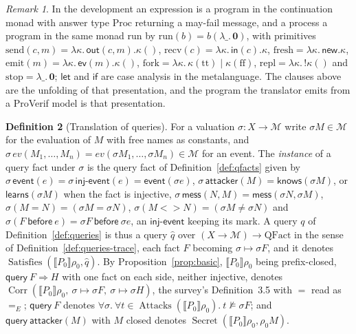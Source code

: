 \documentclass[11pt]{article}
\theoremstyle{definition}
\newtheorem{definition}{Definition}[section]
\theoremstyle{plain}
\theoremstyle{remark}
\newtheorem{remark}[definition]{Remark}
\newcommand{\Proc}{\mathrm{Proc}}
\newcommand{\Attacks}{\operatorname{Attacks}}
\newcommand{\Secret}{\operatorname{Secret}}
\newcommand{\Corr}{\operatorname{Corr}}
\newcommand{\Satisfies}{\operatorname{Satisfies}}
\newcommand{\sem}[1]{\llbracket #1 \rrbracket}
\begin{document}
\begin{remark}
In the development an expression is a program in the continuation monad with answer type $\Proc$ returning a may-fail message, and a process a program in the same monad run by $\mathrm{run}(b)=b(\lambda\_.\,\mathbf{0})$, with primitives $\mathrm{send}(c,m)=\lambda\kappa.\,\mathsf{out}(c,m).\kappa()$, $\mathrm{recv}(c)=\lambda\kappa.\,\mathsf{in}(c).\kappa$, $\mathrm{fresh}=\lambda\kappa.\,\mathsf{new}.\kappa$, $\mathrm{emit}(m)=\lambda\kappa.\,\mathsf{ev}(m).\kappa()$, $\mathrm{fork}=\lambda\kappa.\,\kappa(\mathrm{tt})\mid\kappa(\mathrm{ff})$, $\mathrm{repl}=\lambda\kappa.\,!\kappa()$ and $\mathrm{stop}=\lambda\_.\,\mathbf{0}$; $\mathsf{let}$ and $\mathsf{if}$ are case analysis in the metalanguage. The clauses above are the unfolding of that presentation, and the program the translator emits from a ProVerif model is that presentation.
\end{remark}

\begin{definition}[Translation of queries]\label{def:queries-translation}
For a valuation $\sigma:X\to\mathcal{M}$ write $\sigma M\in\mathcal{M}$ for the evaluation of $M$ with free names as constants, and $\sigma\,ev(M_1,\dots,M_n)=ev(\sigma M_1,\dots,\sigma M_n)\in\mathcal{M}$ for an event. The \emph{instance} of a query fact under $\sigma$ is the query fact of Definition~\ref{def:qfacts} given by $\sigma\,\mathsf{event}(e)=\sigma\,\mathsf{inj\text{-}event}(e)=\mathsf{event}(\sigma e)$, $\sigma\,\mathsf{attacker}(M)=\mathsf{knows}(\sigma M)$, or $\mathsf{learns}(\sigma M)$ when the fact is injective, $\sigma\,\mathsf{mess}(N,M)=\mathsf{mess}(\sigma N,\sigma M)$, $\sigma(M=N)=(\sigma M=\sigma N)$, $\sigma(M\mathbin{<>}N)=(\sigma M\ne\sigma N)$ and $\sigma(F\ \mathsf{before}\ e)=\sigma F\ \mathsf{before}\ \sigma e$, an $\mathsf{inj\text{-}event}$ keeping its mark. A query $q$ of Definition~\ref{def:queries} is thus a query $\hat q$ over $(X\to\mathcal{M})\to\mathrm{QFact}$ in the sense of Definition~\ref{def:queries-trace}, each fact $F$ becoming $\sigma\mapsto\sigma F$, and it denotes $\Satisfies(\sem{P_0}\rho_0,\hat q)$. By Proposition~\ref{prop:basic}, $\sem{P_0}\rho_0$ being prefix-closed, $\mathsf{query}\ F\Longrightarrow H$ with one fact on each side, neither injective, denotes $\Corr(\sem{P_0}\rho_0,\ \sigma\mapsto\sigma F,\ \sigma\mapsto\sigma H)$, the survey's Definition~3.5 with $=$ read as $=_E$; $\mathsf{query}\ F$ denotes $\forall\sigma.\ \forall t\in\Attacks(\sem{P_0}\rho_0).\ t\not\models\sigma F$; and $\mathsf{query}\ \mathsf{attacker}(M)$ with $M$ closed denotes $\Secret(\sem{P_0}\rho_0,\rho_0M)$.
\end{definition}
\end{document}
